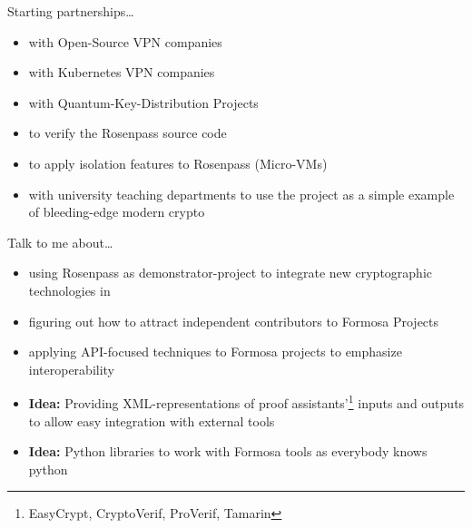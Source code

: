 \documentclass{rosenpass-beamer}
\begin{document}
\begin{frame}{Starting partnerships\dots}
\begin{itemize}
  \item with Open-Source VPN companies
  \item with Kubernetes VPN companies
  \item with Quantum-Key-Distribution Projects
  \item to verify the Rosenpass source code
  \item to apply isolation features to Rosenpass (Micro-VMs)
  \item with university teaching departments to use the project as a simple example of bleeding-edge modern crypto
\end{itemize}
\end{frame}

\begin{frame}{Talk to me about\dots}
\vspace{0.5cm}
\begin{itemize}
  \item using Rosenpass as demonstrator-project to integrate new cryptographic technologies in
  \item figuring out how to attract independent contributors to Formosa Projects
  \item applying API-focused techniques to Formosa projects to emphasize interoperability
  \item \textbf{Idea:} Providing XML-representations of proof assistants'\footnote{EasyCrypt, CryptoVerif, ProVerif, Tamarin} inputs and outputs to allow easy integration with external tools
  \item \textbf{Idea:} Python libraries to work with Formosa tools as everybody knows python
\end{itemize}
\vspace*{1.5cm}
\end{frame}
\end{document}
